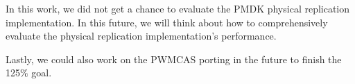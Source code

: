 In this work, we did not get a chance to evaluate the PMDK physical replication implementation. In this future, we will think about how to comprehensively evaluate the physical replication implementation's performance. 

Lastly, we could also work on the PWMCAS porting in the future to finish the 125$\%$ goal.
